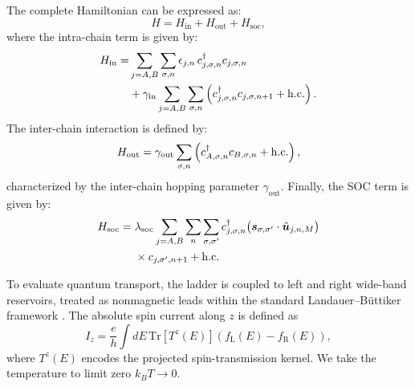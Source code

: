 \documentclass[aps,prb,10pt,superscriptaddress,showkeys,twocolumn,floatfix]{revtex4-1}
\newcommand{\gin}{\gamma_{\mathrm{in}}}
\newcommand{\gout}{\gamma_{\mathrm{out}}}
\begin{document}
The complete Hamiltonian can be expressed as:
\begin{equation}\label{hamiltonian}
H= H_{\mathrm{in}}+ H_{\mathrm{out}}+ H_{\mathrm{soc}},
\end{equation}
where the intra-chain term is given by:
\begin{equation}\label{hamiltonian_intra}
\begin{split}
H_{\mathrm{in}}
= & \sum_{j=A,B}\sum_{\sigma,n}
   \epsilon_{j,n}\,c^{\dagger}_{j,\sigma,n}c_{j,\sigma,n} \\
  & + \gin \sum_{j=A,B}\sum_{\sigma,n}
   \left(c^{\dagger}_{j,\sigma,n}c_{j,\sigma,n+1}+{\rm h.c.}\right).
\end{split}
\end{equation}
The inter-chain interaction is defined by:
\begin{equation}\label{hamiltonian_inter}
H_{\mathrm{out}}
= \gout \sum_{\sigma,n}
  \left(c^{\dagger}_{A,\sigma,n}c_{B,\sigma,n} + {\rm h.c.}\right),
\end{equation}
characterized by the inter-chain hopping parameter $\gout$. Finally, the SOC term is given by:
\begin{equation}\label{h_chain}
\begin{split}
H_{\mathrm{soc}}
  ={}& \lambda_{\mathrm{soc}}\sum_{j=A,B}\sum_{n}\sum_{\sigma,\sigma'}
    c_{j,\sigma,n}^{\dagger}
    \big(\bm{s}_{\sigma,\sigma'}\cdot \hat{\bm{u}}_{j,n,M}\big) \\
   &\times c_{j,\sigma',n+1}
    + {\rm h.c.}
\end{split}
\end{equation}

To evaluate quantum transport, the ladder is coupled to left and right wide-band reservoirs, treated as nonmagnetic leads within the standard Landauer--Büttiker framework \cite{Datta1995,Datta2005}. The absolute spin current along $z$ is defined as
\begin{equation}
I_{z}=\frac{e}{h}\int dE\,\mathrm{Tr}\!\left[T^{z}(E)\right]\left(f_{\mathrm{L}}(E)-f_{\mathrm{R}}(E)\right),
\label{spin_current}
\end{equation}
where $T^{z}(E)$ encodes the projected spin-transmission kernel. We take the temperature to limit zero $k_B T \to 0$.

\end{document}
